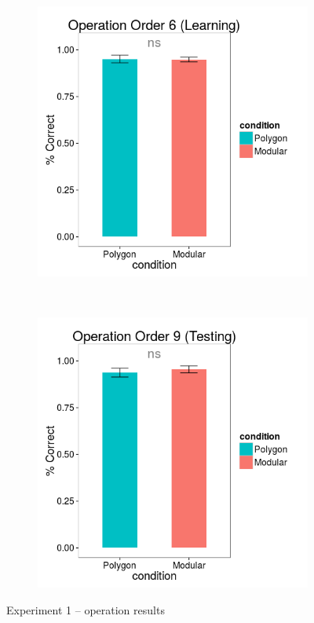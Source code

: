 \documentclass[man,mask,10pt]{apa6}
\begin{document}
\begin{figure}[H]
\centering
\begin{subfigure}[c]{0.3\textwidth}
\centering
\includegraphics[width=\textwidth]{figures/1/op_6_r.png}
\end{subfigure}
~
\begin{subfigure}[c]{0.3\textwidth}
\centering
\includegraphics[width=\textwidth]{figures/1/op_9_r.png}
\end{subfigure}
\caption{Experiment 1 -- operation results}
\label{ex1_op}
\end{figure} 
\end{document}
